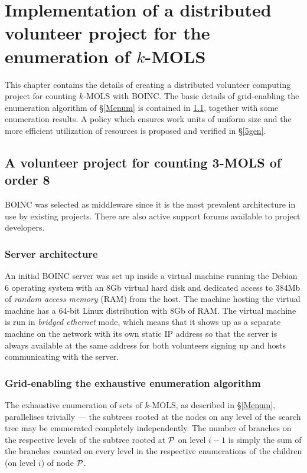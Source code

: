 \chapter[Implementing a distributed project for enumerating $k$-MOLS]{Implementation of a distributed volunteer project for the enumeration of $k$-MOLS}
\vspace{-2em}
\minitoc

This chapter contains the details of creating a distributed volunteer computing project for counting $k$-MOLS with BOINC. The basic details of grid-enabling the enumeration algorithm of \S\ref{Menum} is contained in \ref{51}, together  with some enumeration results.  A policy which ensures work units of uniform size and the more efficient utilization of resources is proposed and verified in \S\ref{5gen}.

 

\section{A volunteer  project for counting 3-MOLS of order 8}\label{51}
BOINC was selected as middleware since it is the most prevalent   architecture in use by existing  projects. There are also  active support forums available to project developers. 
\subsection{Server architecture} \label{5server}
An initial BOINC server was set up inside a virtual machine running the Debian 6 operating system with an 8Gb virtual hard disk and dedicated access to 384Mb of  \emph{random access memory} (RAM) from the host. The machine hosting the virtual machine has a 64-bit Linux distribution with 8Gb of RAM. 
The virtual machine is run in \emph{bridged ethernet} mode, which means that it shows up as a separate machine on the network with its own static IP address so that the server is always available at the same address for both volunteers signing up and hosts communicating with the server.

\subsection{Grid-enabling the exhaustive enumeration algorithm} \label{5grid}
The exhaustive enumeration of sets of $k$-MOLS, as described in \S\ref{Menum}, parallelises trivially --- the subtrees rooted at  the nodes on any level of the search tree may be enumerated completely independently. The   number of branches on the respective levels of the subtree  rooted at $\mathcal{P}$ on level $i-1$ is simply the sum of the branches counted on every level in the respective enumerations of the children (on level $i$) of node $\mathcal{P}$.

